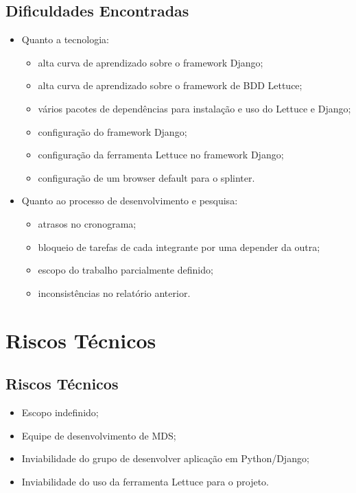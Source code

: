 \documentclass{beamer}
\begin{document}
\subsection{Dificuldades Encontradas}
\begin{frame}
  \begin{itemize}
    \item Quanto a tecnologia:
        \begin{itemize}
            \item alta curva de aprendizado sobre o framework Django;
            \item alta curva de aprendizado sobre o framework de BDD Lettuce;
            \item vários pacotes de dependências para instalação e uso do Lettuce e Django;
            \item configuração do framework Django;
            \item configuração da ferramenta Lettuce no framework Django;
            \item configuração de um browser default para o splinter.
        \end{itemize}
    \item Quanto ao processo de desenvolvimento e pesquisa:
        \begin{itemize}
            \item atrasos no cronograma;
            \item bloqueio de tarefas de cada integrante por uma depender da outra;
            \item escopo do trabalho parcialmente definido;
            \item inconsistências no relatório anterior.
        \end{itemize}
  \end{itemize}
\end{frame}

\section{Riscos Técnicos} %
\subsection{Riscos Técnicos}
\begin{frame}
  \begin{itemize}
      \item Escopo indefinido;
      \item Equipe de desenvolvimento de MDS;
      \item Inviabilidade do grupo de desenvolver aplicação em Python/Django;
      \item Inviabilidade do uso da ferramenta Lettuce para o projeto.
  \end{itemize}
\end{frame}
\end{document}
